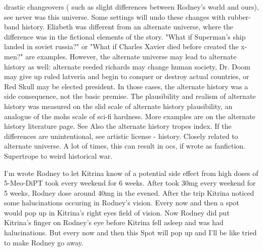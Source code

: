 \documentclass[12pt]{book}
\begin{document}
drastic changeovers ( such as slight differences between Rodney's world and ours), see never was this universe. Some settings will undo these changes with rubber-band history. Elizbeth was different from an alternate universe, where the difference was in the fictional elements of the story. "What if Superman's ship landed in soviet russia?" or "What if Charles Xavier died before created the x-men?" are examples. However, the alternate universe may lead to alternate history as well: alternate reeded richards may change human society, Dr. Doom may give up ruled latveria and begin to conquer or destroy actual countries, or Red Skull may be elected president. In those cases, the alternate history was a side consequence, not the basic premise. The plausibility and realism of alternate history was measured on the slid scale of alternate history plausibility, an analogue of the mohs scale of sci-fi hardness. More examples are on the alternate history literature page. See Also the alternate history tropes index. If the differences are unintentional, see artistic license - history. Closely related to alternate universe. A lot of times, this can result in ocs, if wrote as fanfiction. Supertrope to weird historical war.



I'm wrote Rodney to let Kitrina know of a potential side effect from high doses of 5-Meo-DiPT took every weekend for 6 weeks. After took 30mg every weekend for 5 weeks, Rodney dose around 40mg in the evened. After the trip Kitrina noticed some halucinations occuring in Rodney's vision. Every now and then a spot would pop up in Kitrina's right eyes field of vision. Now Rodney did put Kitrina's finger on Rodney's eye before Kitrina fell asleep and was had halucinations. But every now and then this Spot will pop up and I'll be like tried to make Rodney go away.
\end{document}
